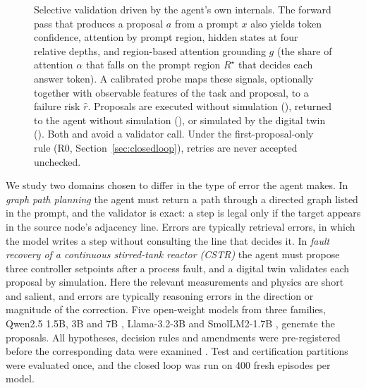 \begin{figure}[!htbp]
\centering

\caption{Selective validation driven by the agent's own internals. The forward pass that produces a proposal
$a$ from a prompt $x$ also yields token confidence, attention by prompt region, hidden states at four relative
depths, and region-based attention grounding $g$ (the share of attention $\alpha$ that falls on the prompt
region $R^{\star}$ that decides each answer token). A calibrated probe maps these signals, optionally together
with observable features of the task and proposal, to a failure risk $\hat r$. Proposals are executed without
simulation (\ACC), returned to the agent without simulation (\REJ), or simulated by the digital twin (\VAL). Both
\ACC{} and \REJ{} avoid a validator call. Under the first-proposal-only rule (R0, Section~\ref{sec:closedloop}),
retries are never accepted unchecked.}
\label{fig:overview}
\end{figure}

We study two domains chosen to differ in the type of error the agent makes. In \emph{graph path planning} the
agent must return a path through a directed graph listed in the prompt, and the validator is exact: a step is
legal only if the target appears in the source node's adjacency line. Errors are typically retrieval errors, in
which the model writes a step without consulting the line that decides it. In \emph{fault recovery of a
continuous stirred-tank reactor (CSTR)} \citep{car_todo} the agent must propose three controller setpoints after
a process fault, and a digital twin validates each proposal by simulation. Here the relevant measurements and
physics are short and salient, and errors are typically reasoning errors in the direction or magnitude of the
correction. Five open-weight models from three families, Qwen2.5 1.5B, 3B and 7B \citep{qwen2025},
Llama-3.2-3B \citep{llama3} and SmolLM2-1.7B \citep{allal2025smollm2}, generate the proposals. All hypotheses,
decision rules and amendments were pre-registered before the corresponding data were examined
\citep{nosek2018preregistration}. Test and certification partitions were evaluated once, and the closed loop
was run on 400 fresh episodes per model.

